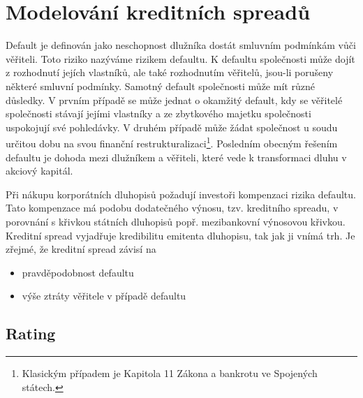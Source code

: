 \documentclass[a4paper]{book}
\begin{document}
\chapter{Modelování kreditních spreadů}

Default je definován jako neschopnost dlužníka dostát smluvním podmínkám vůči věřiteli. Toto riziko nazýváme rizikem defaultu. K defaultu společnosti může dojít z rozhodnutí jejích vlastníků, ale také rozhodnutím  věřitelů, jsou-li porušeny některé smluvní podmínky. Samotný default společnosti může mít různé důsledky. V prvním případě se může jednat o okamžitý default, kdy se věřitelé společnosti stávají jejími vlastníky a ze zbytkového majetku společnosti uspokojují své pohledávky. V druhém případě může žádat společnost u soudu určitou dobu na svou finanční restrukturalizaci\footnote{Klasickým případem je Kapitola 11 Zákona a bankrotu ve Spojených státech.}. Posledním obecným řešením defaultu je dohoda mezi dlužníkem a věřiteli, které vede k transformaci dluhu v akciový kapitál.

Při nákupu korporátních dluhopisů požadují investoři kompenzaci rizika defaultu. Tato kompenzace má podobu dodatečného výnosu, tzv. kreditního spreadu, v porovnání s křivkou státních dluhopisů popř. mezibankovní výnosovou křivkou. Kreditní spread vyjadřuje kredibilitu emitenta dluhopisu, tak jak ji vnímá trh. Je zřejmé, že kreditní spread závisí na
\begin{itemize}
\item pravděpodobnost defaultu
\item výše ztráty věřitele v případě defaultu
\end{itemize}

\section{Rating}
\end{document}
